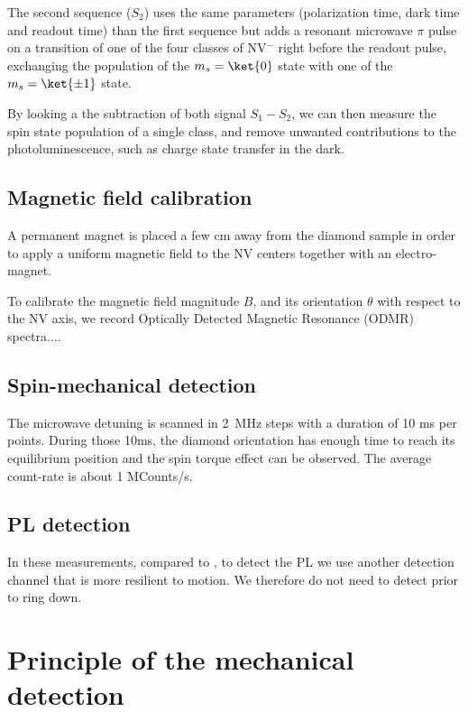 \documentclass[preprintnumbers,amsmath,amssymb,onecolumn,12pt]{revtex4}
\begin{document}
The second sequence ($S_2$) uses the same parameters (polarization time, dark time and readout time) than the first sequence but adds a resonant microwave $\pi$ pulse on a transition of one of the four classes of NV$^-$ right before the readout pulse, exchanging the population of the $m_s=\ket{0}$ state with one of the $m_s=\ket{\pm 1}$ state.

By looking a the subtraction of both signal $S_1-S_2$, we can then measure the spin state population of a single class, and remove unwanted contributions to the photoluminescence, such as charge state transfer in the dark.

\subsection{Magnetic field calibration}

A permanent magnet is placed a few cm away from the diamond sample in order to apply a uniform magnetic field to the NV centers together with an electro-magnet.

To calibrate the magnetic field magnitude $B$, and its orientation $\theta$ with respect to the NV axis, we record Optically Detected Magnetic Resonance (ODMR) spectra.... 



\subsection{Spin-mechanical detection}

The microwave detuning is scanned in 2~MHz steps with a duration of 10 ms per points. During those 10ms, the diamond orientation has enough time to reach its equilibrium position and the spin torque effect can be observed. The average count-rate is about 1 MCounts/s.

\subsection{PL detection}

In these measurements, compared to \cite{DelordNat}, to detect the PL we use another detection channel that is more resilient to motion. We therefore do not need to detect prior to ring down.

\section{Principle of the mechanical detection}
\end{document}
